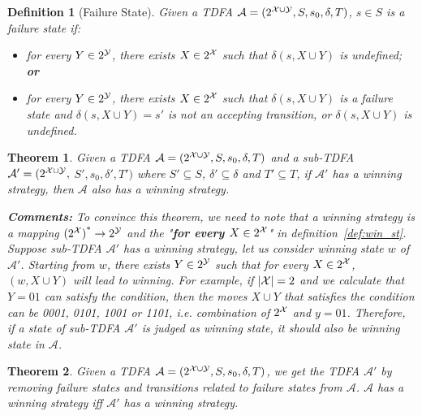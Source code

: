 \documentclass[10pt]{article}
\newtheorem{myDefinition}{Definition}
\newtheorem{myTheorem}{Theorem}
\begin{document}
\begin{myDefinition}[Failure State]
Given a TDFA $\mathcal{A} =(2^{\mathcal{X}\cup \mathcal{Y}},S,s_0,\delta,T)$, $s\in S$ is a failure state if:
\begin{itemize}
    \item for every $Y \in 2^{\mathcal{Y}}$, there exists $X \in2^{\mathcal{X}}$ such that $\delta(s,X \cup Y)$ is undefined; \textbf{or}
    \item for every $Y \in 2^{\mathcal{Y}}$, there exists $X \in2^{\mathcal{X}}$ such that $\delta(s,X \cup Y)$ is a failure state and $\delta(s,X \cup Y)=s'$ is not an accepting transition, or $\delta(s, X\cup Y)$ is undefined.
\end{itemize}
\end{myDefinition}

\begin{myTheorem}
Given a TDFA $\mathcal{A} =(2^{\mathcal{X} \cup \mathcal{Y}}, S, s_0, \delta, T)$ and a sub-TDFA $\mathcal{A}' =(2^{\mathcal{X} \cup \mathcal{Y}},$ $S',s_0,\delta',T')$ where $S'\subseteq S$, $\delta'\subseteq \delta$ and $T'\subseteq T$, if $\mathcal{A}'$ has a winning strategy, then $\mathcal{A}$ also has a winning strategy.

\textbf{Comments: } To convince this theorem, we need to note that a winning strategy is a mapping ${(2^{\mathcal{X}})}^*\to 2^{\mathcal{Y}}$ and the "\textbf{for every $X \in 2^{\mathcal{X}}$}" in definition~\ref{def:win_st}. Suppose sub-TDFA $\mathcal{A}'$ has a winning strategy, let us consider winning state $w$ of $\mathcal{A}'$. Starting from $w$, there exists $Y \in 2^{\mathcal{Y}}$ such that for every $X \in2^{\mathcal{X}}$, $(w, X \cup Y)$ will lead to winning. For example, if $|\mathcal{X}| = 2$ and we calculate that $Y = 01$ can satisfy the condition, then the moves $X \cup Y$ that satisfies the condition can be 0001, 0101, 1001 or 1101, i.e. combination of $2^{\mathcal{X}}$ and $y=01$. Therefore, if a state of sub-TDFA $\mathcal{A}'$ is judged as winning state, it should also be winning state in $\mathcal{A}$.
\end{myTheorem}

\begin{myTheorem}
Given a TDFA $\mathcal{A} =(2^{\mathcal{X} \cup \mathcal{Y}}, S, s_0, \delta, T)$, we get the TDFA $\mathcal{A}'$ by removing failure states and transitions related to failure states from $\mathcal{A}$. $\mathcal{A}$ has a winning strategy iff $\mathcal{A}'$ has a winning strategy.
\end{myTheorem}
\end{document}
